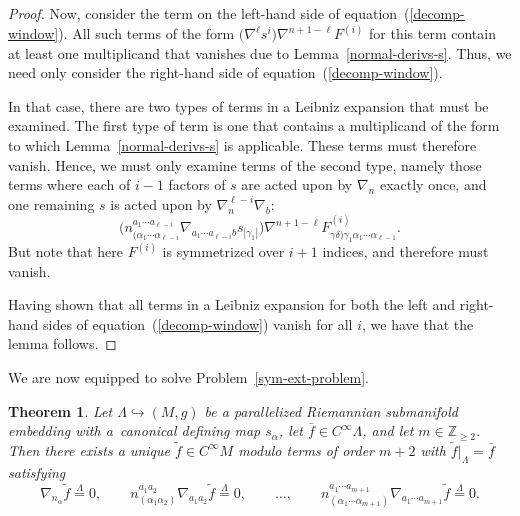 \documentclass[10pt,a4paper]{article}
\numberwithin{equation}{section}
\newtheorem{Theorem}{Theorem}[section]
\renewcommand{\=}{\stackrel \Lambda =}
\begin{document}
\begin{proof}
Now, consider the term on the left-hand side of equation~(\ref{decomp-window}). All such terms of the form $\bigl(\nabla^\ell s^i\bigr) \nabla^{n+1-\ell} F^{(i)}$ for this term contain at least one multiplicand that vanishes due to Lemma~\ref{normal-derivs-s}. Thus, we need only consider the right-hand side of equation~(\ref{decomp-window}).

In that case, there are two types of terms in a Leibniz expansion that must be examined. The first type of term is one that contains a multiplicand of the form to which Lemma~\ref{normal-derivs-s} is applicable. These terms must therefore vanish. Hence, we must only examine terms of the second type, namely those terms where each of $i-1$ factors of $s$ are acted upon by $\nabla_n$ exactly once, and one remaining $s$ is acted upon by $\nabla_n^{\ell-i} \nabla_b$:
\[\bigl(n^{a_1 \cdots a_{\ell-i}}_{(\alpha_1 \cdots \alpha_{\ell-i}} \nabla_{a_1 \cdots a_{\ell-i}b }s_{|\gamma_1|}\bigr) \nabla^{n+1-\ell} F^{(i)}_{\gamma \delta) \gamma_1 \alpha_1 \cdots \alpha_{\ell-1}} .\]
But note that here $F^{(i)}$ is symmetrized over $i+1$ indices, and therefore must vanish.

Having shown that all terms in a Leibniz expansion for both the left and right-hand sides of equation~(\ref{decomp-window}) vanish for all $i$, we have that the lemma follows.
\end{proof}

We are now equipped to solve Problem~\ref{sym-ext-problem}.
\begin{Theorem} \label{sym-ext-prop}
Let $\Lambda \hookrightarrow (M,g)$ be a parallelized Riemannian submanifold embedding with a~canonical defining map $s_{\alpha}$, let $\bar{f} \in C^\infty \Lambda$, and let $m \in \mathbb{Z}_{\geq 2}$. Then there exists a unique $\tilde{f} \in C^\infty M$ modulo terms of order $m+2$ with $\tilde{f}|_{\Lambda} = \bar{f}$ satisfying
\[\nabla_{n_{\alpha}} \tilde{f} \= 0 , \qquad n^{a_1 a_2}_{(\alpha_1 \alpha_2)} \nabla_{a_1 a_2} \tilde{f} \= 0 , \qquad \ldots , \qquad n^{a_1 \cdots a_{m+1}}_{(\alpha_1 \cdots \alpha_{m+1})} \nabla_{a_1 \cdots a_{m+1}} \tilde{f} \= 0 .\]
\end{Theorem}
\end{document}

